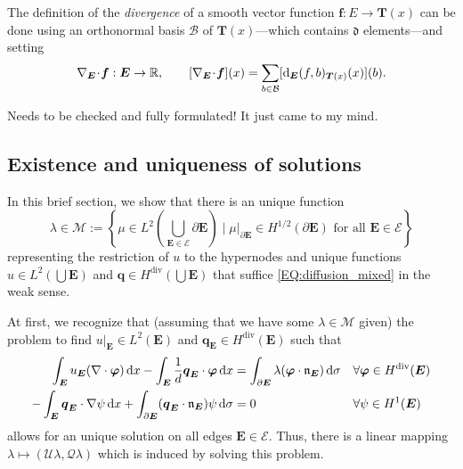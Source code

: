 \documentclass[a4paper, english, 12pt, reqno, draft]{amsart}
\theoremstyle{definition}
\theoremstyle{remark}
\numberwithin{equation}{section}
\newcommand{\SetEdge}{\ensuremath{\boldsymbol{\mathcal E}}}
\newcommand{\Edge}{{\ensuremath{\boldsymbol E}}}
\newcommand{\locDim}{\ensuremath{\mathfrak d}}
\newcommand{\Der}{\ensuremath{\textup d_\Edge}}
\newcommand{\Nabla}{\ensuremath{\nabla_\Edge}}
\newcommand{\Div}{\ensuremath{\Nabla\!\cdot\!}}
\newcommand{\tangent}{\ensuremath{{\boldsymbol T}}}
\newcommand{\Normal}{\ensuremath{\mathfrak n_\Edge}}
\newcommand{\basis}{\ensuremath{\mathcal B}}
\newcommand{\IR}{\ensuremath{\mathbb R}}
\newcommand{\skeletalSpaceCont}{\ensuremath{\mathcal M}}
\renewcommand{\vec}[1]{\ensuremath{\boldsymbol{#1}}}
\newcommand{\dx}{\ensuremath{\, \textup d x}}
\newcommand{\ds}{\ensuremath{\, \textup d \sigma}}
\newcommand{\localU}{\ensuremath{\mathcal U}}
\newcommand{\localQ}{\ensuremath{\vec{\mathcal Q}}}
\begin{document}
The definition of the \emph{divergence} of a smooth vector function $\vec f \colon E \to \tangent(x)$ can be done using an orthonormal basis $\basis$ of $\tangent(x)$---which contains $\locDim$ elements---and setting
% 
\begin{equation*}
 \Div \vec f: \Edge \to \IR, \qquad [\Div \vec f](x) = \sum_{b \in \basis} [\Der (f, b)_{\tangent(x)} (x)](b).
\end{equation*}
% 
\begin{envarerror}{Needs to be checked and fully formulated! It just came to my mind.}
% 
\subsection{Existence and uniqueness of solutions}\label{SEC:ExUnique}
% 
In this brief section, we show that there is an unique function
% 
\begin{equation}
 \lambda \in \skeletalSpaceCont := \left\{ \mu \in L^2(\bigcup_{\Edge \in \SetEdge} \partial \Edge) \; \bigg| \; \mu |_{\partial \Edge} \in H^{1/2} (\partial \Edge) \text{ for all } \Edge \in \SetEdge \right\}
\end{equation}
% 
representing the restriction of $u$ to the hypernodes and unique functions $u \in L^2(\bigcup \Edge)$ and $\vec q \in H^{\operatorname{div}}(\bigcup \Edge)$ that suffice \eqref{EQ:diffusion_mixed} in the weak sense.

At first, we recognize that (assuming that we have some $\lambda \in \skeletalSpaceCont$ given) the problem to find $u|_\Edge \in L^2(\Edge)$ and $\vec q_\Edge \in H^{\operatorname{div}}(\Edge)$ such that
% 
\begin{subequations}\label{EQ:cont_lambda}
\begin{align}
 \int_\Edge u_\Edge (\nabla \cdot \vec \varphi) \dx - \int_\Edge \frac{1}{d} \vec q_\Edge \cdot \vec \varphi \dx & = \int_{\partial \Edge} \lambda (\vec \varphi \cdot \Normal) \ds && \forall \vec \varphi \in H^{\operatorname{div}}(\Edge) \\
 - \int_\Edge \vec q_\Edge \cdot \nabla \psi \dx + \int_{\partial \Edge} (\vec q_\Edge \cdot \Normal) \psi \ds & = 0 && \forall \psi \in H^1(\Edge)
\end{align}
\end{subequations}
% 
allows for an unique solution on all edges $\Edge \in \SetEdge$. Thus, there is a linear mapping $\lambda \mapsto (\localU \lambda, \localQ\lambda)$ which is induced by solving this problem.


\end{envarerror}
\end{document}
